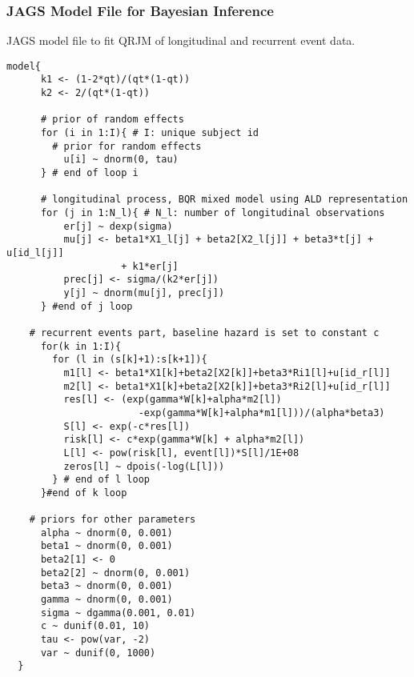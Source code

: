 


\subsubsection{\textsf{JAGS} Model File for Bayesian Inference}
\textsf{JAGS} model file to fit QRJM of longitudinal and recurrent event data.
{\scriptsize
\begin{verbatim}
model{
      k1 <- (1-2*qt)/(qt*(1-qt))
      k2 <- 2/(qt*(1-qt))

      # prior of random effects
      for (i in 1:I){ # I: unique subject id
        # prior for random effects
          u[i] ~ dnorm(0, tau)
      } # end of loop i

      # longitudinal process, BQR mixed model using ALD representation
      for (j in 1:N_l){ # N_l: number of longitudinal observations
          er[j] ~ dexp(sigma)
          mu[j] <- beta1*X1_l[j] + beta2[X2_l[j]] + beta3*t[j] + u[id_l[j]]
          			+ k1*er[j]
          prec[j] <- sigma/(k2*er[j])
          y[j] ~ dnorm(mu[j], prec[j])
      } #end of j loop

    # recurrent events part, baseline hazard is set to constant c
      for(k in 1:I){
        for (l in (s[k]+1):s[k+1]){
          m1[l] <- beta1*X1[k]+beta2[X2[k]]+beta3*Ri1[l]+u[id_r[l]]
          m2[l] <- beta1*X1[k]+beta2[X2[k]]+beta3*Ri2[l]+u[id_r[l]]
          res[l] <- (exp(gamma*W[k]+alpha*m2[l])
                       -exp(gamma*W[k]+alpha*m1[l]))/(alpha*beta3)
          S[l] <- exp(-c*res[l])
          risk[l] <- c*exp(gamma*W[k] + alpha*m2[l])
          L[l] <- pow(risk[l], event[l])*S[l]/1E+08
          zeros[l] ~ dpois(-log(L[l]))
        } # end of l loop
      }#end of k loop

    # priors for other parameters
      alpha ~ dnorm(0, 0.001)
      beta1 ~ dnorm(0, 0.001)
      beta2[1] <- 0
      beta2[2] ~ dnorm(0, 0.001)
      beta3 ~ dnorm(0, 0.001)
      gamma ~ dnorm(0, 0.001)
      sigma ~ dgamma(0.001, 0.01)
      c ~ dunif(0.01, 10)
      tau <- pow(var, -2)
      var ~ dunif(0, 1000)
  }
\end{verbatim}
}
